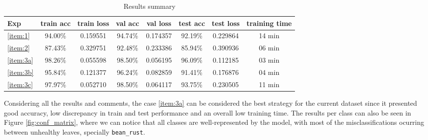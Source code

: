 \documentclass[10pt, a4paper]{article}
\begin{document}

\begin{table}[htpb]
  \centering
  \begin{tabular}{l|c|c|c|c|c|c|c|}
    Exp             &	train acc	       & train loss	    & val acc  & val loss	 & test acc	 & test loss & training time \\
    \hline
    \ref{item:1}    & 94.00\%          & 0.159551       & 94.74\%  & 0.174357  & 92.19\%   & 0.229864  & 14 min        \\
    \ref{item:2}    & 87.43\%          & 0.329751       & 92.48\%  & 0.233386  & 85.94\%   & 0.390936  & 06 min        \\
    \ref{item:3a}   & 98.26\%          & 0.055598       & 98.50\%  & 0.056195  & 96.09\%   & 0.112185  & 03 min        \\
    \ref{item:3b}   & 95.84\%          & 0.121377       & 96.24\%  & 0.082859  & 91.41\%   & 0.176876  & 04 min        \\
    \ref{item:3c}   & 97.97\%          & 0.052710       & 98.50\%  & 0.064117  & 93.75\%   & 0.230505  & 11 min        \\
    \hline
  \end{tabular}
  \caption{Results summary}
  \label{tab:results_summ}
\end{table}

Considering all the results and comments, the case \ref{item:3a} can be considered the best strategy for the current dataset since it presented good accuracy, low discrepancy in 
train and test performance and an overall low training time. The results per class can also be seen in Figure \ref{fig:conf_matrix}, where we can notice that all classes
are well-represented by the model, with most of the misclassifications ocurring between unhealthy leaves, specially {\tt bean\_rust}.
\end{document}
